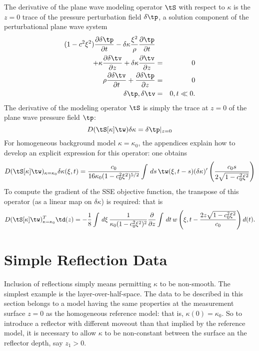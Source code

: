 The derivative of the plane wave modeling operator $\tS$ with respect
to $\kappa$ is the $z=0$ trace of the pressure perturbation field
$\delta \tp$, a solution component of the perturbational plane wave
system
\begin{eqnarray}
\label{eqn:dawepw}
(1-c^2\xi^2)\frac{\partial \delta \tp}{\partial t} -
  \delta \kappa \frac{\xi^2}{\rho}\frac{\partial \tp}{\partial t}
  \nonumber\\
+\kappa\frac{\partial
  \delta \tv}{\partial z} + \delta \kappa\frac{\partial
  \tv}{\partial z} &=& 0 \nonumber\\
\rho \frac{\partial \delta \tv}{\partial t} + \frac{\partial \delta \tp}{\partial
  z}&=&0\nonumber\\
\delta \tp,\delta \tv&=&0, t \ll 0.
\end{eqnarray}
The derivative of the modeling operator $\tS$ is simply the trace at
$z=0$ of the plane wave pressure field $\tp$:
\begin{equation}
\label{eqn:dmodpw}
D(\tS[\kappa]\tw)\delta \kappa = \delta \tp|_{z=0}
\end{equation}
For homogeneous background model $\kappa=\kappa_0$, the appendices
explain how to develop an explicit expression for this operator: one
obtains
\begin{equation}
\label{eqn:dmodhom}
D(\tS[\kappa]\tw)_{\kappa=\kappa_0}\delta \kappa(\xi,t) =
\frac{c_0}{16\kappa_0 (1-c_0^2\xi^2)^{5/2}}\int \,ds\,\tw(\xi,t-s)(\delta \kappa)'  \left(\frac{c_0
      s}{2\sqrt{1-c_0^2\xi^2}}\right)
\end{equation}
To compute the gradient of the SSE objective function, the transpose
of this operator (as a linear map on $\delta \kappa$) is required:
that is
\begin{equation}
\label{eqn:dmodhomadj}
D(\tS[\kappa]\tw)_{\kappa=\kappa_0}^T\td(z) =
- 
\frac{1}{8} \int \,d\xi\,\frac{1}{\kappa_0 (1-c_0^2\xi^2)^2}\frac{\partial}{\partial z} \int \,dt\,
  w\left(\xi,t-\frac{2z\sqrt{1-c_0^2\xi^2}}{c_0}\right)d(t).
\end{equation}


\section{Simple Reflection Data}

Inclusion of reflections simply means permitting $\kappa$ to be
non-smooth. The simplest example is the layer-over-half-space. The
data to be described in this section belongs to a model having the
same properties at the measurement surface $z=0$ as the homogeneous
reference model: that is, $\kappa(0)=\kappa_0$. So to introduce a
reflector with different moveout than that implied by the reference
model, it is necessary to allow $\kappa$ to be non-constant between
the surface an the reflector depth, say $z_1 > 0$. 

